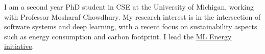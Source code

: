 

\begin{cvparagraph}

I am a second year PhD student in CSE at the University of Michigan, working with Professor Mosharaf Chowdhury.
My research interest is in the intersection of software systems and deep learning, with a recent focus on sustainability aspects such as energy consumption and carbon footprint.
I lead the \href{https://ml.energy}{\underline{ML Energy initiative}}.
\end{cvparagraph}
